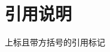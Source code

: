 \documentclass{ctexart}%
\begin{document}
	\tableofcontents\newpage
	\section{引用说明}
	上标且带方括号的引用标记\cite{ChenXiangDong2015,alum}

	\printbibliography[title=参考文献,heading=bibintoc]
\end{document}
